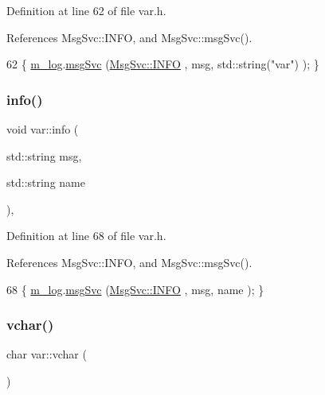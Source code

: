 Definition at line 62 of file var.\+h.



References Msg\+Svc\+::\+I\+N\+FO, and Msg\+Svc\+::msg\+Svc().


\begin{DoxyCode}
62 \{ \hyperlink{classvar_a5dfdc5180270038b686ad3013874a026}{m\_log}.\hyperlink{classMsgSvc_ad25f18047920cc59a314e5098259711c}{msgSvc} (\hyperlink{classMsgSvc_ae671eb7301996cd049d2da8a65925926ad2fcf3f3e734fc41ee097cc23670ce51}{MsgSvc::INFO}    , msg, std::string(\textcolor{stringliteral}{"var"}) ); \}
\end{DoxyCode}
\mbox{\label{classvar_a52f41c560b167041c7d4e17a42021d5c}} 
\subsubsection{\texorpdfstring{info()}{info()}\hspace{0.1cm}{\footnotesize\ttfamily [2/2]}}
{\footnotesize\ttfamily void var\+::info (\begin{DoxyParamCaption}\item[{std\+::string}]{msg,  }\item[{std\+::string}]{name }\end{DoxyParamCaption})\hspace{0.3cm}{\ttfamily [inline]}, {\ttfamily [private]}}



Definition at line 68 of file var.\+h.



References Msg\+Svc\+::\+I\+N\+FO, and Msg\+Svc\+::msg\+Svc().


\begin{DoxyCode}
68 \{ \hyperlink{classvar_a5dfdc5180270038b686ad3013874a026}{m\_log}.\hyperlink{classMsgSvc_ad25f18047920cc59a314e5098259711c}{msgSvc} (\hyperlink{classMsgSvc_ae671eb7301996cd049d2da8a65925926ad2fcf3f3e734fc41ee097cc23670ce51}{MsgSvc::INFO}    , msg, name ); \}
\end{DoxyCode}
\mbox{\label{classvar_af5c2865eb834ce2d22991a3250d278ba}} 
\subsubsection{\texorpdfstring{vchar()}{vchar()}}
{\footnotesize\ttfamily char var\+::vchar (\begin{DoxyParamCaption}{ }\end{DoxyParamCaption})\hspace{0.3cm}{\ttfamily [inline]}}



